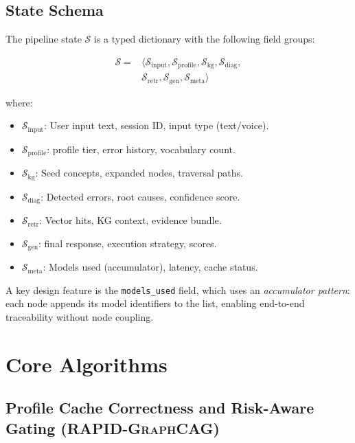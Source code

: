 \documentclass[11pt,a4paper,twocolumn]{article}
\newcommand{\rapid}{\textsc{RAPID-GraphCAG}}
\begin{document}
\subsection{State Schema}

The pipeline state $\mathcal{S}$ is a typed dictionary with the following field groups:

\begin{equation}
\begin{aligned}
\mathcal{S} ={}& \langle \mathcal{S}_\text{input}, \mathcal{S}_\text{profile}, \mathcal{S}_\text{kg}, \mathcal{S}_\text{diag}, \\
& \mathcal{S}_\text{retr}, \mathcal{S}_\text{gen}, \mathcal{S}_\text{meta} \rangle
\end{aligned}
\end{equation}

\noindent where:
\begin{itemize}[leftmargin=*]
  \item $\mathcal{S}_\text{input}$: User input text, session ID, input type (text/voice).
  \item $\mathcal{S}_\text{profile}$: profile tier, error history, vocabulary count.
  \item $\mathcal{S}_\text{kg}$: Seed concepts, expanded nodes, traversal paths.
  \item $\mathcal{S}_\text{diag}$: Detected errors, root causes, confidence score.
  \item $\mathcal{S}_\text{retr}$: Vector hits, KG context, evidence bundle.
  \item $\mathcal{S}_\text{gen}$: final response, execution strategy, scores.
  \item $\mathcal{S}_\text{meta}$: Models used (accumulator), latency, cache status.
\end{itemize}

A key design feature is the \texttt{models\_used} field, which uses an \emph{accumulator pattern}: each node appends its model identifiers to the list, enabling end-to-end traceability without node coupling.

\section{Core Algorithms}
\label{sec:algorithms}

\subsection{Profile Cache Correctness and Risk-Aware Gating (\rapid{})}
\end{document}
